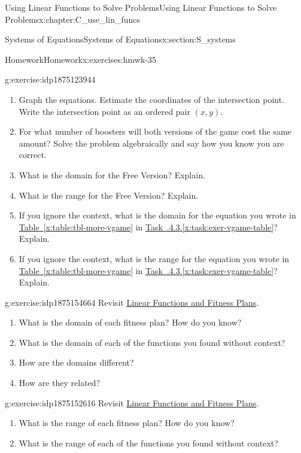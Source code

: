 \documentclass[oneside,10pt,]{book}
\newcommand{\xreffont}{\relax}
\numberwithin{equation}{chapter}
\begin{document}
\begin{chapterptx}{Using Linear Functions to Solve Problems}{}{Using Linear Functions to Solve Problems}{}{}{x:chapter:C_use_lin_funcs}
\begin{sectionptx}{Systems of Equations}{}{Systems of Equations}{}{}{x:section:S_systems}
\begin{exercises-subsection}{Homework}{}{Homework}{}{}{x:exercises:hmwk-35}
\begin{divisionexercise}{3}{}{}{g:exercise:idp1875123944}
\begin{enumerate}[font=\bfseries,label=(\alph*),ref=\alph*]
\item{}Graph the equations. Estimate the coordinates of the intersection point. Write the intersection point as an ordered pair \((x, y)\).%
\item{}For what number of boosters will both versions of the game cost the same amount? Solve the problem algebraically and say how you know you are correct.%
\item{}What is the domain for the Free Version? Explain.%
\item{}What is the range for the Free Version? Explain.%
\item{}If you ignore the context, what is the domain for the equation you wrote in \hyperref[x:table:tbl-more-vgame]{Table~{\xreffont\ref{x:table:tbl-more-vgame}}} in \hyperref[x:task:exer-vgame-table]{Task~{\xreffont 3.5.4.3}.{\xreffont\ref{x:task:exer-vgame-table}}}? Explain.%
\item{}If you ignore the context, what is the range for the equation you wrote in \hyperref[x:table:tbl-more-vgame]{Table~{\xreffont\ref{x:table:tbl-more-vgame}}} in \hyperref[x:task:exer-vgame-table]{Task~{\xreffont 3.5.4.3}.{\xreffont\ref{x:task:exer-vgame-table}}}? Explain.%
\end{enumerate}
\end{divisionexercise}%
\begin{divisionexercise}{4}{}{}{g:exercise:idp1875154664}%
Revisit \hyperref[x:worksheet:act-fitness]{Linear Functions and Fitness Plans}.%
\begin{enumerate}[font=\bfseries,label=(\alph*),ref=\alph*]
\item{}What is the domain of each fitness plan? How do you know?%
\item{}What is the domain of each of the functions you found without context?%
\item{}How are the domains different?%
\item{}How are they related?%
\end{enumerate}
\end{divisionexercise}%
\begin{divisionexercise}{5}{}{}{g:exercise:idp1875152616}%
Revisit \hyperref[x:worksheet:act-fitness]{Linear Functions and Fitness Plans}.%
\begin{enumerate}[font=\bfseries,label=(\alph*),ref=\alph*]
\item{}What is the range of each fitness plan? How do you know?%
\item{}What is the range of each of the functions you found without context?%

\end{enumerate}
\end{divisionexercise}
\end{exercises-subsection}
\end{sectionptx}
\end{chapterptx}
\end{document}
